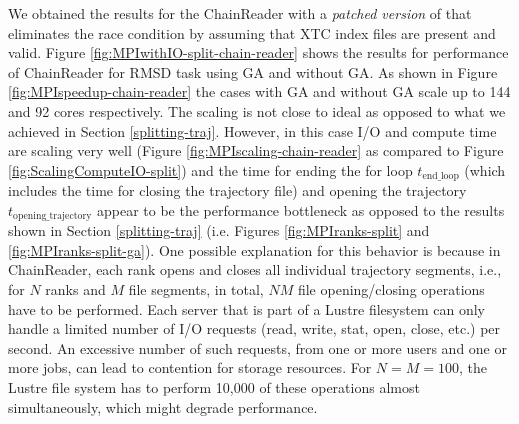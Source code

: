 We obtained the results for the ChainReader with a \emph{patched version} of  that eliminates the race condition by assuming that XTC index files are present and valid. 
Figure \ref{fig:MPIwithIO-split-chain-reader} shows the results for performance of ChainReader for RMSD task using GA and without GA. 
As shown in Figure \ref{fig:MPIspeedup-chain-reader} the cases with GA and without GA scale up to 144 and 92 cores respectively.
The scaling is not close to ideal as opposed to what we achieved in Section \ref{splitting-traj}. 
However, in this case I/O and compute time are scaling very well (Figure \ref{fig:MPIscaling-chain-reader} as compared to Figure \ref{fig:ScalingComputeIO-split}) and the time for ending the for loop $t_{\text{end\_loop}}$ (which includes the time for closing the trajectory file) and opening the trajectory $t_{\text{opening\_trajectory}}$ appear to be the performance bottleneck as opposed to the results shown in Section \ref{splitting-traj} (i.e. Figures \ref{fig:MPIranks-split} and \ref{fig:MPIranks-split-ga}). 
One possible explanation for this behavior is because in ChainReader, each rank opens and closes all individual trajectory segments, i.e., for $N$ ranks and $M$ file segments, in total, $N M$ file opening/closing operations have to be performed. 
Each server that is part of a Lustre filesystem can only handle a limited number of I/O requests (read, write, stat, open, close, etc.) per second.
An excessive number of such requests, from one or more users and one or more jobs, can lead to contention for storage resources. 
For $N=M=100$, the Lustre file system has to perform 10,000 of these operations almost simultaneously, which might degrade performance. 
 
